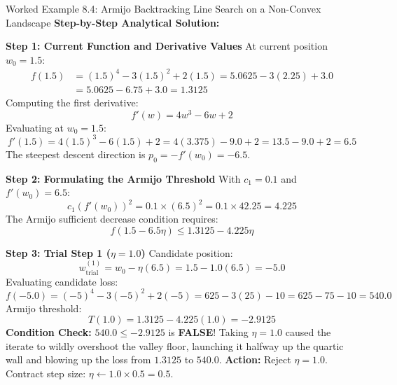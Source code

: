 \begin{examplebox}[breakable]{Worked Example 8.4: Armijo Backtracking Line Search on a Non-Convex Landscape}
\tcblower
\textbf{Step-by-Step Analytical Solution:}

\textbf{Step 1: Current Function and Derivative Values}
At current position $w_0 = 1.5$:
\begin{align*}
f(1.5) &= (1.5)^4 - 3(1.5)^2 + 2(1.5) = 5.0625 - 3(2.25) + 3.0 \\
&= 5.0625 - 6.75 + 3.0 = \mathbf{1.3125}
\end{align*}
Computing the first derivative:
\begin{equation*}
f'(w) = 4w^3 - 6w + 2
\end{equation*}
Evaluating at $w_0 = 1.5$:
\begin{equation*}
f'(1.5) = 4(1.5)^3 - 6(1.5) + 2 = 4(3.375) - 9.0 + 2 = 13.5 - 9.0 + 2 = \mathbf{6.5}
\end{equation*}
The steepest descent direction is $p_0 = -f'(w_0) = -6.5$.

\textbf{Step 2: Formulating the Armijo Threshold}
With $c_1 = 0.1$ and $f'(w_0) = 6.5$:
\begin{equation*}
c_1 (f'(w_0))^2 = 0.1 \times (6.5)^2 = 0.1 \times 42.25 = 4.225
\end{equation*}
The Armijo sufficient decrease condition requires:
\begin{equation*}
f(1.5 - 6.5\eta) \le 1.3125 - 4.225 \eta
\end{equation*}

\textbf{Step 3: Trial Step 1 ($\eta = 1.0$)}
Candidate position:
\begin{equation*}
w_{\text{trial}}^{(1)} = w_0 - \eta (6.5) = 1.5 - 1.0(6.5) = -5.0
\end{equation*}
Evaluating candidate loss:
\begin{equation*}
f(-5.0) = (-5)^4 - 3(-5)^2 + 2(-5) = 625 - 3(25) - 10 = 625 - 75 - 10 = \mathbf{540.0}
\end{equation*}
Armijo threshold:
\begin{equation*}
T(1.0) = 1.3125 - 4.225(1.0) = -2.9125
\end{equation*}
\textbf{Condition Check:} $540.0 \le -2.9125$ is \textbf{FALSE}!
Taking $\eta = 1.0$ caused the iterate to wildly overshoot the valley floor, launching it halfway up the quartic wall and blowing up the loss from $1.3125$ to $540.0$.
\textbf{Action:} Reject $\eta = 1.0$. Contract step size: $\eta \leftarrow 1.0 \times 0.5 = 0.5$.


\end{examplebox}
